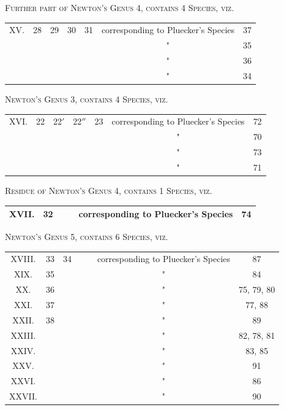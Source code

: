 \documentclass[11pt,a4paper]{article}
\theoremstyle{plain}
\begin{document}
\begin{center}
\textsc{Further part of Newton's Genus 4, contains 4 Species, viz.}
\end{center}
\begin{center}
\begin{tabular}{ccccccc}
\toprule
XV. & 28 & 29 & 30 & 31 & corresponding to Pluecker's Species & 37 \\
  & & & & & " & 35 \\
  & & & & & " & 36 \\
  & & & & & " & 34 \\
\bottomrule
\end{tabular}
\end{center}

\begin{center}
\textsc{Newton's Genus 3, contains 4 Species, viz.}
\end{center}
\begin{center}
\begin{tabular}{ccccccc}
\toprule
XVI. & 22 & 22$'$ & 22$''$ & 23 & corresponding to Pluecker's Species & 72 \\
  & & & & & " & 70 \\
  & & & & & " & 73 \\
  & & & & & " & 71 \\
\bottomrule
\end{tabular}
\end{center}

\begin{center}
\textsc{Residue of Newton's Genus 4, contains 1 Species, viz.}
\end{center}
\begin{center}
\begin{tabular}{cccccc}
\toprule
XVII. & 32 & & & corresponding to Pluecker's Species & 74 \\
\bottomrule
\end{tabular}
\end{center}

\begin{center}
\textsc{Newton's Genus 5, contains 6 Species, viz.}
\end{center}
\begin{center}
\begin{tabular}{ccccccc}
\toprule
XVIII. & 33 & 34 & & & corresponding to Pluecker's Species & 87 \\
XIX. & 35 & & & & " & 84 \\
XX. & 36 & & & & " & 75, 79, 80 \\
XXI. & 37 & & & & " & 77, 88 \\
XXII. & 38 & & & & " & 89 \\
XXIII. & & & & & " & 82, 78, 81 \\
XXIV. & & & & & " & 83, 85 \\
XXV. & & & & & " & 91 \\
XXVI. & & & & & " & 86 \\
XXVII. & & & & & " & 90 \\
\bottomrule
\end{tabular}
\end{center}
\end{document}
